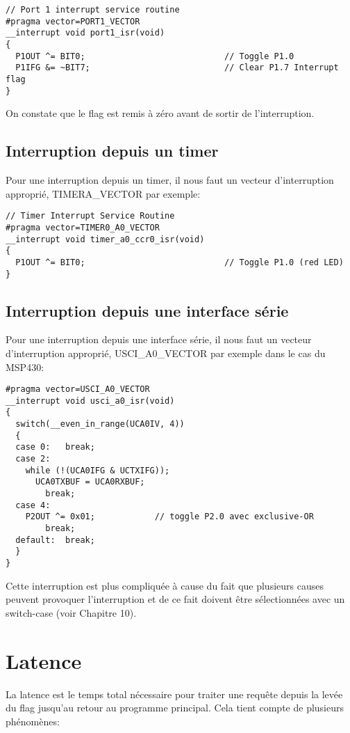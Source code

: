 \lstset{style=customc}
\begin{lstlisting}
// Port 1 interrupt service routine
#pragma vector=PORT1_VECTOR
__interrupt void port1_isr(void)
{
  P1OUT ^= BIT0;                            // Toggle P1.0
  P1IFG &= ~BIT7;                           // Clear P1.7 Interrupt flag
}
\end{lstlisting}

On constate que le flag est remis à zéro avant de sortir de l'interruption.

\subsection{Interruption depuis un timer}
Pour une interruption depuis un timer, il nous faut un vecteur d'interruption approprié, TIMERA\_VECTOR par exemple:

\lstset{style=customc}
\begin{lstlisting}
// Timer Interrupt Service Routine
#pragma vector=TIMER0_A0_VECTOR
__interrupt void timer_a0_ccr0_isr(void)
{
  P1OUT ^= BIT0;                      		// Toggle P1.0 (red LED)
}
\end{lstlisting}

\subsection{Interruption depuis une interface série}
Pour une interruption depuis une interface série, il nous faut un vecteur d'interruption approprié, USCI\_A0\_VECTOR par exemple dans le cas du MSP430:

\lstset{style=customc}
\begin{lstlisting}
#pragma vector=USCI_A0_VECTOR
__interrupt void usci_a0_isr(void)
{
  switch(__even_in_range(UCA0IV, 4))
  {
  case 0: 	break;
  case 2:
    while (!(UCA0IFG & UCTXIFG));
 	  UCA0TXBUF = UCA0RXBUF;
		break;
  case 4:
   	P2OUT ^= 0x01;            // toggle P2.0 avec exclusive-OR 
		break;
  default: 	break;
  }
}
\end{lstlisting}

Cette interruption est plus compliquée à cause du fait que plusieurs causes peuvent provoquer l'interruption et de ce fait doivent être sélectionnées avec un switch-case (voir Chapitre 10).

\section{Latence}
La latence est le temps total nécessaire pour traiter une requête depuis la levée du flag jusqu'au retour au programme principal. Cela tient compte de plusieurs phénomènes:

